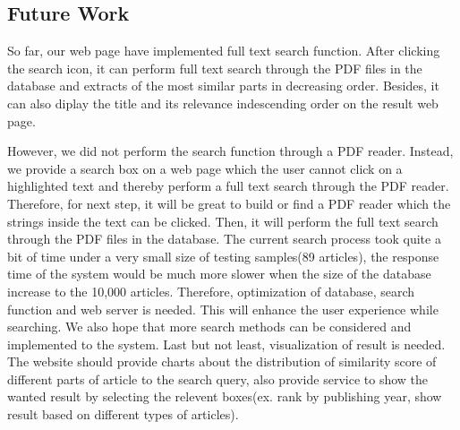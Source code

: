 
\subsection{Future Work}
So far, our web page have implemented full text search function. After clicking the search icon, it can perform full text search through the PDF files in the database and extracts of the most similar parts in decreasing order. Besides, it can also diplay the title and its relevance indescending order  on the result web page.

However, we did not perform the search function through a PDF reader. Instead, we provide a search box on a web page which the user cannot click on a highlighted text and thereby perform a full text search through the PDF reader. Therefore, for next step, it will be great to build or find a PDF reader which the strings inside the text can be clicked. Then, it will perform the full text search through the PDF files in the database. The current search process took quite a bit of time under a very small size of testing samples(89 articles), the response time of the system would be much more slower when the size of the database increase to the 10,000 articles. Therefore, optimization of database, search function and web server is needed. This will enhance the user experience while searching. We also hope that more search methods can be considered and implemented to the system. Last but not least, visualization of result is needed. The website should provide charts about the distribution of similarity score of different parts of article to the search query, also provide service to show the wanted result by selecting the relevent boxes(ex. rank by publishing year, show result based on different types of articles).